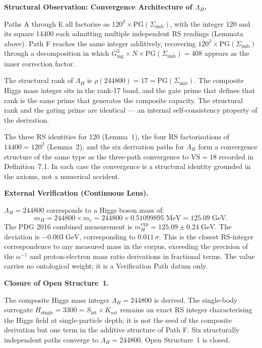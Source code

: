 \documentclass[11pt, letterpaper]{article}
\newcommand{\Sinter}{S_{\mathrm{int}}}
\theoremstyle{definition}
\theoremstyle{plain}
\begin{document}
\begin{observebox}
\textbf{Structural Observation: Convergence Architecture of $\Lambda_H$.}

Paths A through E all factorise as $120^2 \times \mathrm{PG}(\Sigma_\mathrm{imb})$,
with the integer 120 and its square 14400 each admitting multiple independent
RS readings (Lemmata above). Path F reaches the same integer additively, recovering
$120^2 \times \mathrm{PG}(\Sigma_\mathrm{imb})$ through a decomposition in which
$G_\mathrm{mg}^3 \times N \times \mathrm{PG}(\Sigma_\mathrm{imb}) = 408$ appears as
the inner correction factor.

The structural rank of $\Lambda_H$ is $\rho(244800) = 17 = \mathrm{PG}(\Sigma_\mathrm{imb})$.
The composite Higgs mass integer sits in the rank-17 band, and the gate prime that defines
that rank is the same prime that generates the composite capacity. The structural rank and
the gating prime are identical — an internal self-consistency property of the derivation.

The three RS identities for 120 (Lemma~1), the four RS factorisations of $14400 = 120^2$
(Lemma~2), and the six derivation paths for $\Lambda_H$ form a convergence structure
of the same type as the three-path convergence to $\mathrm{VS} = 18$ recorded in
Definition~7.1. In each case the convergence is a structural identity grounded in the
axioms, not a numerical accident.
\end{observebox}

\begin{verifybox}
\textbf{External Verification (Continuous Lens).}

$\Lambda_H = 244800$ corresponds to a Higgs boson mass of:
\[
    m_H = 244800 \times m_e = 244800 \times 0.51099895\;\mathrm{MeV} = 125.09\;\mathrm{GeV}.
\]
The PDG 2016 combined measurement is $m_H^\mathrm{exp} = 125.09 \pm 0.24\;\mathrm{GeV}$.
The deviation is $-0.003\;\mathrm{GeV}$, corresponding to $0.011\,\sigma$. This is the
closest RS-integer correspondence to any measured mass in the corpus, exceeding the
precision of the $\alpha^{-1}$ and proton-electron mass ratio derivations in fractional
terms. The value carries no ontological weight; it is a Verification Path datum only.
\end{verifybox}

\begin{rsbox}
\textbf{Closure of Open Structure~1.}

The composite Higgs mass integer $\Lambda_H = 244800$ is derived. The single-body surrogate
$H_\mathrm{single} = 3300 = \Sinter \times K_\mathrm{sat}$ remains an exact RS integer
characterising the Higgs field at single-particle depth; it is not the seed of the
composite derivation but one term in the additive structure of Path F. Six structurally
independent paths converge to $\Lambda_H = 244800$. Open Structure~1 is closed.
\end{rsbox}
\end{document}
